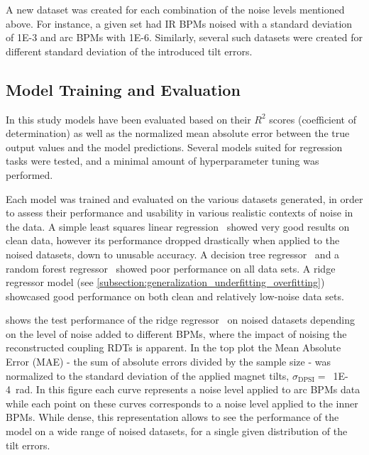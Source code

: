 A new dataset was created for each combination of the noise levels mentioned above.
For instance, a given set had IR BPMs noised with a standard deviation of \num{1E-3} and arc BPMs with \num{1E-6}.
Similarly, several such datasets were created for different standard deviation of the introduced tilt errors.

\subsection{Model Training and Evaluation}

In this study models have been evaluated based on their \(R^2\) scores (coefficient of determination) as well as the normalized mean absolute error between the true output values and the model predictions.
Several models suited for regression tasks were tested, and a minimal amount of hyperparameter tuning was performed.

Each model was trained and evaluated on the various datasets generated, in order to assess their performance and usability in various realistic contexts of noise in the data. 
A simple least squares linear regression~\cite{PNAS:Lai:Strong_Consistency_Least_Squares_Estimates_Regression_Models} showed very good results on clean data, however its performance dropped drastically when applied to the noised datasets, down to unusable accuracy.
A decision tree regressor~\cite{BOOK:Breiman:Classification_Regression_Trees} and a random forest regressor~\cite{ML:Breiman:Random_Forests} showed poor performance on all data sets.
A ridge regressor model (see \cref{subsection:generalization_underfitting_overfitting}) showcased good performance on both clean and relatively low-noise data sets.

 shows the test performance of the ridge regressor~\cite{MIT:Rifkin:Regularized_Least_Squares} on noised datasets depending on the level of noise added to different BPMs, where the impact of noising the reconstructed coupling RDTs is apparent.
In the top plot the Mean Absolute Error (MAE) - the sum of absolute errors divided by the sample size - was normalized to the standard deviation of the applied magnet tilts, \(\sigma_{\mathrm{DPSI}} =\)~\qty{1E-4}{\radian}.
In this figure each curve represents a noise level applied to arc BPMs data while each point on these curves corresponds to a noise level applied to the inner BPMs.
While dense, this representation allows to see the performance of the model on a wide range of noised datasets, for a single given distribution of the tilt errors.

